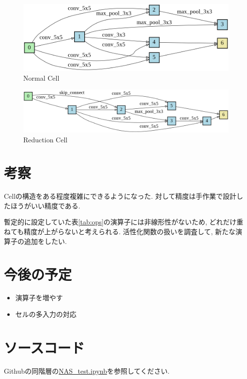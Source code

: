 \documentclass[twocolumn]{jarticle}     %
\begin{document}
\begin{figure}[t]
	\begin{center}
		\includegraphics[clip,width=12.5cm]{completenormal.png}
		\caption{Normal Cell}
		\label{fig:cell}
	\end{center}
\end{figure}

\begin{figure}[t]
	\begin{center}
		\includegraphics[clip,width=14.5cm]{completereduce.png}
		\caption{Reduction Cell}
		\label{fig:cell2}
	\end{center}
\end{figure}

\section{考察}
Cellの構造をある程度複雑にできるようになった.
対して精度は手作業で設計したほうがいい精度である.

暫定的に設定していた表\ref{tab:ops}の演算子には非線形性がないため, どれだけ重ねても精度が上がらないと考えられる.
活性化関数の扱いを調査して, 新たな演算子の追加をしたい.

\section{今後の予定}
\begin{itemize}
  \item 演算子を増やす
  \item セルの多入力の対応
\end{itemize}

\section{ソースコード}
Githubの同階層の\url{NAS_test.ipynb}を参照してください.



\end{document}
